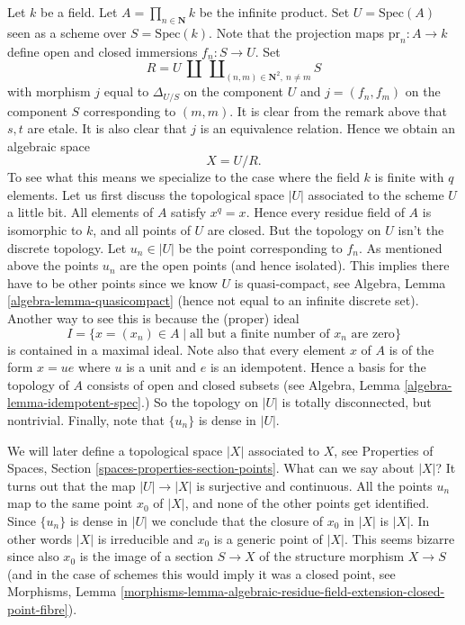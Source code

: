 \begin{example}
\label{example-infinite-product}
Let $k$ be a field.
Let $A = \prod_{n \in \mathbf{N}} k$ be the infinite product.
Set $U = \text{Spec}(A)$ seen as a scheme over $S = \text{Spec}(k)$.
Note that the projection maps $\text{pr}_n : A \to k$ define open
and closed immersions $f_n : S \to U$. Set
$$
R =
U
\ {\textstyle\coprod}
\ \coprod\nolimits_{(n,m) \in \mathbf{N}^2,\ n \not = m} S
$$
with morphism $j$ equal to $\Delta_{U/S}$ on the component $U$
and $j = (f_n, f_m)$ on the component $S$ corresponding to $(m, m)$.
It is clear from the remark above that $s, t$ are etale.
It is also clear that $j$ is an equivalence relation. Hence we
obtain an algebraic space
$$
X = U/R.
$$
To see what this means we specialize to the case where
the field $k$ is finite with $q$ elements. Let us first
discuss the topological space $|U|$ associated to the scheme $U$
a little bit. All elements of $A$ satisfy $x^q = x$.
Hence every residue field of $A$ is isomorphic to $k$, and
all points of $U$ are closed. But the topology on $U$ isn't
the discrete topology. Let $u_n \in |U|$ be the point corresponding
to $f_n$. As mentioned above the points $u_n$ are
the open points (and hence isolated). This implies there have
to be other points since we know $U$ is quasi-compact, see
Algebra, Lemma \ref{algebra-lemma-quasicompact}
(hence not equal to an infinite discrete set).
Another way to see this is because the (proper) ideal
$$
I =
\{x = (x_n) \in A \mid \text{all but a finite number of }x_n\text{ are zero}\}
$$
is contained in a maximal ideal. Note also that every element
$x$ of $A$ is of the form $x = ue$ where $u$ is a unit and $e$ is an
idempotent. Hence a basis for the topology of $A$ consists of open and
closed subsets (see Algebra, Lemma \ref{algebra-lemma-idempotent-spec}.)
So the topology on $|U|$ is totally disconnected, but nontrivial.
Finally, note that $\{u_n\}$ is dense in $|U|$.

\medskip\noindent
We will later define a topological space $|X|$ associated to $X$, see
Properties of Spaces, Section \ref{spaces-properties-section-points}.
What can we say about $|X|$?
It turns out that the map $|U| \to |X|$ is surjective and continuous.
All the points $u_n$ map to the same point $x_0$ of $|X|$, and none of
the other points get identified. Since $\{u_n\}$ is dense in $|U|$ we
conclude that the closure of $x_0$ in $|X|$ is $|X|$. In other words
$|X|$ is irreducible and $x_0$ is a generic point of $|X|$. This seems
bizarre since also $x_0$ is the image of a section
$S \to X$ of the structure morphism $X \to S$ (and in the case of
schemes this would imply it was a closed point, see
Morphisms, Lemma
\ref{morphisms-lemma-algebraic-residue-field-extension-closed-point-fibre}).
\end{example}

